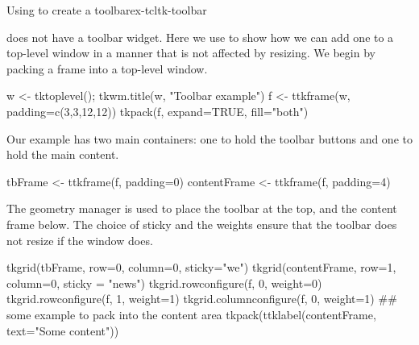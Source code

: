 \begin{example}{Using  to create a toolbar}{ex-tcltk-toolbar}




\TK\/ does not have a toolbar widget. Here we use  to
show how we can add one to a top-level window in a manner that is not
affected by resizing. We begin by packing a frame into a
top-level window.
\begin{Schunk}
\begin{Sinput}
 w <- tktoplevel(); tkwm.title(w, "Toolbar example")
 f <- ttkframe(w, padding=c(3,3,12,12))
 tkpack(f, expand=TRUE, fill="both")
\end{Sinput}
\end{Schunk}
Our example has two main containers: one to hold the toolbar buttons
and one to hold the main content.
\begin{Schunk}
\begin{Sinput}
 tbFrame <- ttkframe(f, padding=0)
 contentFrame <- ttkframe(f, padding=4)
\end{Sinput}
\end{Schunk}
The  geometry manager is used to place the toolbar at
the top, and the content frame below. The choice of sticky and the weights ensure that
the toolbar does not resize if the window does.
\begin{Schunk}
\begin{Sinput}
 tkgrid(tbFrame, row=0, column=0, sticky="we")
 tkgrid(contentFrame, row=1, column=0, sticky = "news")
 tkgrid.rowconfigure(f, 0, weight=0)
 tkgrid.rowconfigure(f, 1, weight=1)
 tkgrid.columnconfigure(f, 0, weight=1)
 ## some example to pack into the content area
 tkpack(ttklabel(contentFrame, text="Some content"))
\end{Sinput}
\end{Schunk}


\end{example}
